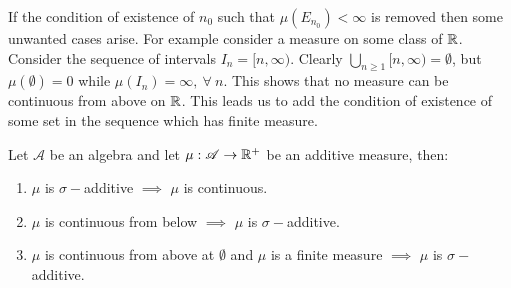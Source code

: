 \begin{remark}
  If the condition of existence of $n_0$ such that $\mu(E_{n_0})<\infty$ is removed then some unwanted cases arise. For example consider a measure on some class of $\mathbb{R}$. Consider the sequence of intervals $I_n = [n,\infty)$. Clearly $\bigcup_{n\geq 1} [n,\infty) = \emptyset$, but $\mu(\emptyset) = 0$ while $\mu(I_n) = \infty,\ \forall\ n$. This shows that no measure can be continuous from above on $\mathbb{R}$. This leads us to add the condition of existence of some set in the sequence which has finite measure. 
\end{remark}
\begin{lemma}\label{lem:continuity}
  Let $ \mathscr{A}$ be an algebra and let $\mu: \mathscr{A}\to \mathbb{R}^+$ be an additive measure, then:
  \begin{enumerate}
    \item $\mu$ is $\sigma-$additive $\implies$ $\mu$ is continuous.
    \item $\mu$ is continuous from below $\implies$ $\mu$ is $\sigma-$additive.
    \item $\mu$ is continuous from above at $\emptyset$ and $\mu$ is a finite measure $\implies$ $\mu$ is $\sigma-$additive.
  \end{enumerate}
\end{lemma}

